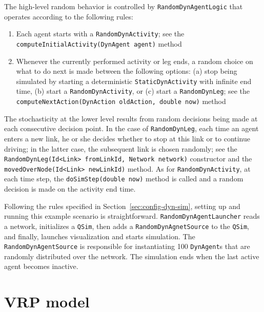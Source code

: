 The high-level random behavior is controlled by \lstinline$RandomDynAgentLogic$ that operates according to the following rules:
%
\begin{enumerate}

	\item Each agent starts with a \lstinline$RandomDynActivity$; see the \lstinline$computeInitialActivity(DynAgent agent)$ method
	
	\item Whenever the currently performed activity or leg ends, a random choice on what to do next is made between the following options: (a) stop being simulated by starting a deterministic \lstinline$StaticDynActivity$ with infinite end time, (b) start a \lstinline$RandomDynActivity$, or (c) start a \lstinline$RandomDynLeg$; see the \lstinline$computeNextAction(DynAction oldAction, double now)$ method

\end{enumerate}

The stochasticity at the lower level results from random decisions being made at each consecutive decision point. In the case of \lstinline$RandomDynLeg$, each time an agent enters a new link, he or she decides whether to stop at this link or to continue driving; in the latter case, the subsequent link is chosen randomly; see the \lstinline$RandomDynLeg(Id<Link> fromLinkId, Network network)$ constructor and the \lstinline$movedOverNode(Id<Link> newLinkId)$ method. As for \lstinline$RandomDynActivity$, at each time step, the \lstinline$doSimStep(double now)$ method is called and a random decision is made on the activity end time.

Following the rules specified in Section~\ref{sec:config-dyn-sim}, setting up and running this example scenario is straightforward. \lstinline$RandomDynAgentLauncher$ reads a network, initializes a \lstinline$QSim$, then adds a \lstinline$RandomDynAgnetSource$ to the \lstinline$QSim$, and finally, launches visualization and starts simulation. The \lstinline$RandomDynAgentSource$ is responsible for instantiating 100 \lstinline$DynAgent$s that are randomly distributed over the network. The simulation ends when the last active agent becomes inactive.


\section{VRP model}

